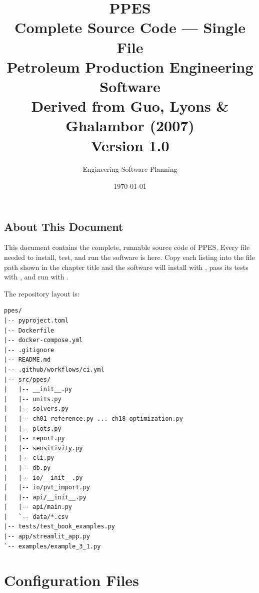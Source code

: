 \documentclass[10pt,a4paper,openany]{book}
\begin{document}
\title{\Huge\textbf{PPES}\\[0.2cm]
\Large Complete Source Code --- Single File\\[0.3cm]
\normalsize Petroleum Production Engineering Software\\
Derived from Guo, Lyons \& Ghalambor (2007)\\[0.4cm]
\normalsize\textbf{Version 1.0}}
\author{Engineering Software Planning}
\date{\today}
\maketitle
\tableofcontents

\chapter*{About This Document}

This document contains the complete, runnable source code of PPES.
Every file needed to install, test, and run the software is here.
Copy each listing into the file path shown in the chapter title and
the software will install with , pass its tests
with , and run with .

The repository layout is:

\begin{lstlisting}[style=plain]
ppes/
|-- pyproject.toml
|-- Dockerfile
|-- docker-compose.yml
|-- .gitignore
|-- README.md
|-- .github/workflows/ci.yml
|-- src/ppes/
|   |-- __init__.py
|   |-- units.py
|   |-- solvers.py
|   |-- ch01_reference.py ... ch18_optimization.py
|   |-- plots.py
|   |-- report.py
|   |-- sensitivity.py
|   |-- cli.py
|   |-- db.py
|   |-- io/__init__.py
|   |-- io/pvt_import.py
|   |-- api/__init__.py
|   |-- api/main.py
|   `-- data/*.csv
|-- tests/test_book_examples.py
|-- app/streamlit_app.py
`-- examples/example_3_1.py
\end{lstlisting}

\part{Configuration Files}
\end{document}
